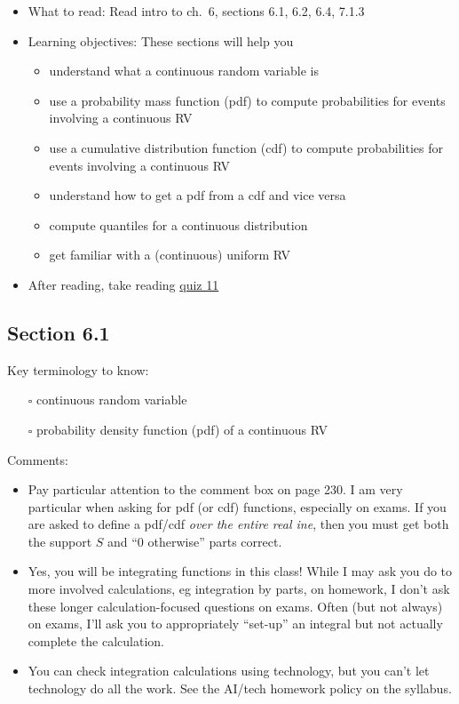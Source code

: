 \documentclass[
  letterpaper,
]{scrbook}
\providecommand{\tightlist}{%
  \setlength{\itemsep}{0pt}\setlength{\parskip}{0pt}}\usepackage{longtable,booktabs,array}
\begin{document}
\begin{itemize}
\item
  What to read: Read intro to ch.~6, sections 6.1, 6.2, 6.4, 7.1.3
\item
  Learning objectives: These sections will help you

  \begin{itemize}
  \tightlist
  \item
    understand what a continuous random variable is
  \item
    use a probability mass function (pdf) to compute probabilities for
    events involving a continuous RV
  \item
    use a cumulative distribution function (cdf) to compute
    probabilities for events involving a continuous RV
  \item
    understand how to get a pdf from a cdf and vice versa
  \item
    compute quantiles for a continuous distribution
  \item
    get familiar with a (continuous) uniform RV
  \end{itemize}
\item
  After reading, take reading
  \href{https://forms.gle/oZGaWtp9KkFa5MmCA}{quiz 11}
\end{itemize}

\subsection*{Section 6.1}\label{section-6.1}

Key terminology to know:

\begin{itemize}
\tightlist
\item[$\square$]
  continuous random variable
\item[$\square$]
  probability density function (pdf) of a continuous RV
\end{itemize}

Comments:

\begin{itemize}
\tightlist
\item
  Pay particular attention to the comment box on page 230. I am very
  particular when asking for pdf (or cdf) functions, especially on
  exams. If you are asked to define a pdf/cdf \emph{over the entire real
  ine}, then you must get both the support \(S\) and ``0 otherwise''
  parts correct.
\item
  Yes, you will be integrating functions in this class! While I may ask
  you do to more involved calculations, eg integration by parts, on
  homework, I don't ask these longer calculation-focused questions on
  exams. Often (but not always) on exams, I'll ask you to appropriately
  ``set-up'' an integral but not actually complete the calculation.
\item
  You can check integration calculations using technology, but you can't
  let technology do all the work. See the AI/tech homework policy on the
  syllabus.
\end{itemize}
\end{document}
